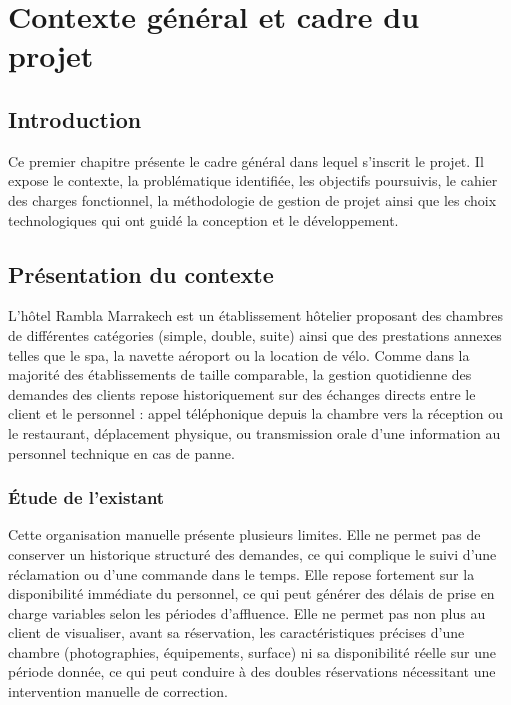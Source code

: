 \documentclass[12pt,a4paper]{report}
\begin{document}
\clearpage

\chapter{Contexte général et cadre du projet}

\section{Introduction}

Ce premier chapitre présente le cadre général dans lequel s'inscrit le
projet. Il expose le contexte, la problématique identifiée, les objectifs
poursuivis, le cahier des charges fonctionnel, la méthodologie de gestion
de projet ainsi que les choix technologiques qui ont guidé la conception
et le développement.

\section{Présentation du contexte}

L'hôtel Rambla Marrakech est un établissement hôtelier proposant des
chambres de différentes catégories (simple, double, suite) ainsi que des
prestations annexes telles que le spa, la navette aéroport ou la location
de vélo. Comme dans la majorité des établissements de taille comparable,
la gestion quotidienne des demandes des clients repose historiquement sur
des échanges directs entre le client et le personnel : appel téléphonique
depuis la chambre vers la réception ou le restaurant, déplacement
physique, ou transmission orale d'une information au personnel technique
en cas de panne.

\subsection{Étude de l'existant}

Cette organisation manuelle présente plusieurs limites. Elle ne permet pas
de conserver un historique structuré des demandes, ce qui complique le
suivi d'une réclamation ou d'une commande dans le temps. Elle repose
fortement sur la disponibilité immédiate du personnel, ce qui peut générer
des délais de prise en charge variables selon les périodes d'affluence.
Elle ne permet pas non plus au client de visualiser, avant sa réservation,
les caractéristiques précises d'une chambre (photographies, équipements,
surface) ni sa disponibilité réelle sur une période donnée, ce qui peut
conduire à des doubles réservations nécessitant une intervention manuelle
de correction.
\end{document}
